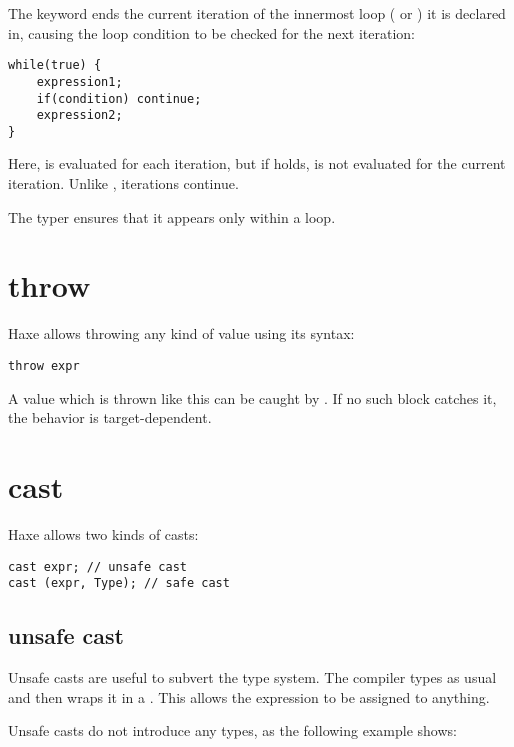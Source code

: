 The  keyword ends the current iteration of the innermost loop ( or ) it is declared in, causing the loop condition to be checked for the next iteration:

\begin{lstlisting}
while(true) {
	expression1;
	if(condition) continue;
	expression2;
}
\end{lstlisting}

Here,  is evaluated for each iteration, but if  holds,  is not evaluated for the current iteration. Unlike , iterations continue.

The typer ensures that it appears only within a loop.


\section{throw}
\label{expression-throw}

Haxe allows throwing any kind of value using its  syntax:

\begin{lstlisting}
throw expr
\end{lstlisting}

A value which is thrown like this can be caught by . If no such block catches it, the behavior is target-dependent.


\section{cast}
\label{expression-cast}

Haxe allows two kinds of casts:

\begin{lstlisting}
cast expr; // unsafe cast
cast (expr, Type); // safe cast
\end{lstlisting}

\subsection{unsafe cast}
\label{expression-cast-unsafe}

Unsafe casts are useful to subvert the type system. The compiler types  as usual and then wraps it in a . This allows the expression to be assigned to anything.

Unsafe casts do not introduce any  types, as the following example shows:

